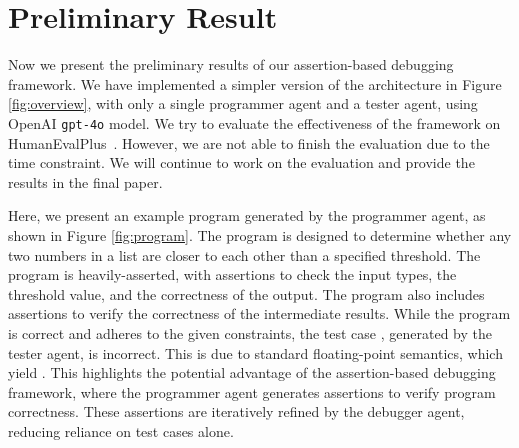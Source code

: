 \section{Preliminary Result}

Now we present the preliminary results of our assertion-based debugging framework. We have implemented a simpler version of the architecture in Figure \ref{fig:overview}, with only a single programmer agent and a tester agent, using OpenAI \texttt{gpt-4o} model. We try to evaluate the effectiveness of the framework on HumanEvalPlus~\cite{evalplus}. However, we are not able to finish the evaluation due to the time constraint. We will continue to work on the evaluation and provide the results in the final paper.

Here, we present an example program generated by the programmer agent, as shown in Figure \ref{fig:program}. The program is designed to determine whether any two numbers in a list are closer to each other than a specified threshold. 
The program is heavily-asserted, with assertions to check the input types, the threshold value, and the correctness of the output. The program also includes assertions to verify the correctness of the intermediate results.
While the program is correct and adheres to the given constraints, the test case , generated by the tester agent, is incorrect. This is due to standard floating-point semantics, which yield . This highlights the potential advantage of the assertion-based debugging framework, where the programmer agent generates assertions to verify program correctness. These assertions are iteratively refined by the debugger agent, reducing reliance on test cases alone.

